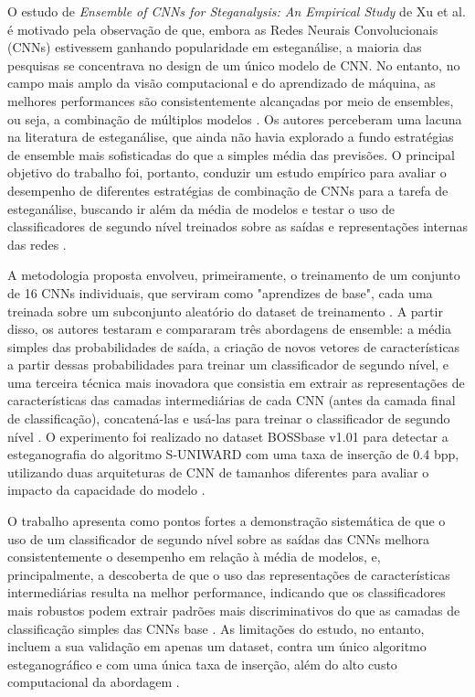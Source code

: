 \documentclass[12pt]{article}
\begin{document}
O estudo de \textit{Ensemble of CNNs for Steganalysis: An Empirical Study} de
Xu et al. é motivado pela observação de que, embora as Redes Neurais
Convolucionais (CNNs) estivessem ganhando popularidade em esteganálise, a
maioria das pesquisas se concentrava no design de um único modelo de CNN. No
entanto, no campo mais amplo da visão computacional e do aprendizado de
máquina, as melhores performances são consistentemente alcançadas por meio de
ensembles, ou seja, a combinação de múltiplos modelos \cite{xu2016ensemble}. Os
autores perceberam uma lacuna na literatura de esteganálise, que ainda não
havia explorado a fundo estratégias de ensemble mais sofisticadas do que a
simples média das previsões. O principal objetivo do trabalho foi, portanto,
conduzir um estudo empírico para avaliar o desempenho de diferentes estratégias
de combinação de CNNs para a tarefa de esteganálise, buscando ir além da média
de modelos e testar o uso de classificadores de segundo nível treinados sobre
as saídas e representações internas das redes \cite{xu2016ensemble}.

A metodologia proposta envolveu, primeiramente, o treinamento de um conjunto de
16 CNNs individuais, que serviram como "aprendizes de base", cada uma treinada
sobre um subconjunto aleatório do dataset de treinamento \cite{xu2016ensemble}.
A partir disso, os autores testaram e compararam três abordagens de ensemble: a
média simples das probabilidades de saída, a criação de novos vetores de
características a partir dessas probabilidades para treinar um classificador de
segundo nível, e uma terceira técnica mais inovadora que consistia em extrair
as representações de características das camadas intermediárias de cada CNN
(antes da camada final de classificação), concatená-las e usá-las para treinar
o classificador de segundo nível \cite{xu2016ensemble}. O experimento foi
realizado no dataset BOSSbase v1.01 para detectar a esteganografia do algoritmo
S-UNIWARD com uma taxa de inserção de 0.4 bpp, utilizando duas arquiteturas de
CNN de tamanhos diferentes para avaliar o impacto da capacidade do modelo
\cite{xu2016ensemble}.

O trabalho apresenta como pontos fortes a demonstração sistemática de que o uso
de um classificador de segundo nível sobre as saídas das CNNs melhora
consistentemente o desempenho em relação à média de modelos, e, principalmente,
a descoberta de que o uso das representações de características intermediárias
resulta na melhor performance, indicando que os classificadores mais robustos
podem extrair padrões mais discriminativos do que as camadas de classificação
simples das CNNs base \cite{xu2016ensemble}. As limitações do estudo, no
entanto, incluem a sua validação em apenas um dataset, contra um único
algoritmo esteganográfico e com uma única taxa de inserção, além do alto custo
computacional da abordagem \cite{xu2016ensemble}.
\end{document}

